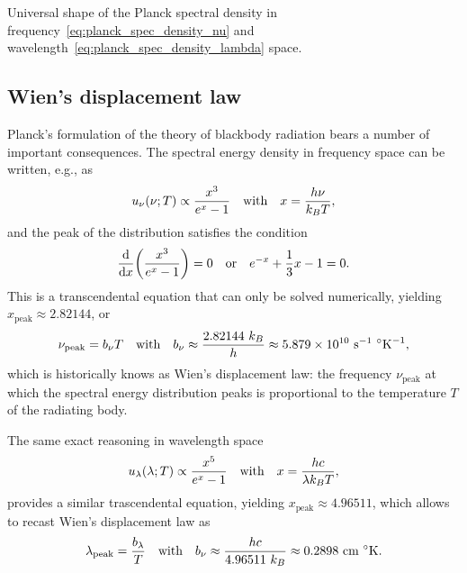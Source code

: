 \begin{marginfigure}
  
  
  \caption{Universal shape of the Planck spectral density in
  frequency~\eqref{eq:planck_spec_density_nu} and wavelength~\eqref{eq:planck_spec_density_lambda}
  space.}
  \label{fig:planck_distribution}
\end{marginfigure}



\subsection{Wien's displacement law}
\label{sec:wien_law}

Planck's formulation of the theory of blackbody radiation bears a number of important
consequences. The spectral energy density in frequency space can be written, e.g., as
\begin{align*}
  u_\nu(\nu; T) \propto \frac{x^3}{e^x - 1}
  \quad\text{with}\quad
  x = \frac{h\nu}{k_B T},
\end{align*}
and the peak of the distribution satisfies the condition
\begin{align*}
  \dv{x} (\frac{x^3}{e^x - 1}) = 0
  \quad\text{or}\quad
  e^{-x} + \frac{1}{3}x - 1 = 0.
\end{align*}
This is a transcendental equation that can only be solved numerically, yielding
$x_\text{peak} \approx 2.82144$, or
\begin{align}
  \nu_\text{peak} = b_\nu T
  \quad\text{with}\quad
  b_\nu \approx \frac{2.82144~k_B}{h} \approx
  5.879 \times 10^{10}~\text{s}^{-1}~^\circ \text{K}^{-1},
\end{align}
which is historically knows as Wien's displacement law: the frequency $\nu_\text{peak}$
at which the spectral energy distribution peaks is proportional to the temperature
$T$ of the radiating body.

The same exact reasoning in wavelength space
\begin{align*}
  u_\lambda(\lambda; T) \propto \frac{x^5}{e^x - 1}
  \quad\text{with}\quad
  x = \frac{hc}{\lambda k_B T},
\end{align*}
provides a similar trascendental equation, yielding $x_\text{peak} \approx 4.96511$,
which allows to recast Wien's displacement law as
\begin{align}
  \lambda_\text{peak} = \frac{b_\lambda}{T}
  \quad\text{with}\quad
  b_\nu \approx \frac{hc}{4.96511~k_B} \approx
  0.2898~\text{cm}~^\circ \text{K}.
\end{align}



